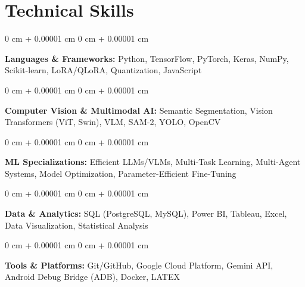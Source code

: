 \documentclass[9pt, letterpaper]{article}
\newenvironment{onecolentry}{
    \begin{adjustwidth}{
        0 cm + 0.00001 cm
    }{
        0 cm + 0.00001 cm
    }
}{
    \end{adjustwidth}
} %
\begin{document}
\section{Technical Skills}
        \begin{onecolentry}
            \textbf{Languages \& Frameworks:} Python, TensorFlow, PyTorch, Keras, NumPy, Scikit-learn, LoRA/QLoRA, Quantization, JavaScript
        \end{onecolentry}
        \vspace{0.05 cm}
        \begin{onecolentry}
            \textbf{Computer Vision \& Multimodal AI:} Semantic Segmentation, Vision Transformers (ViT, Swin), VLM, SAM-2, YOLO, OpenCV
        \end{onecolentry}
        \vspace{0.05 cm}
        \begin{onecolentry}
            \textbf{ML Specializations:} Efficient LLMs/VLMs, Multi-Task Learning, Multi-Agent Systems, Model Optimization, Parameter-Efficient Fine-Tuning
        \end{onecolentry}
        \vspace{0.05 cm}
        \begin{onecolentry}
            \textbf{Data \& Analytics:} SQL (PostgreSQL, MySQL), Power BI, Tableau, Excel, Data Visualization, Statistical Analysis
        \end{onecolentry}
        \vspace{0.05 cm}
        \begin{onecolentry}
            \textbf{Tools \& Platforms:} Git/GitHub, Google Cloud Platform, Gemini API, Android Debug Bridge (ADB), Docker, LATEX
        \end{onecolentry}
        
\end{document}
